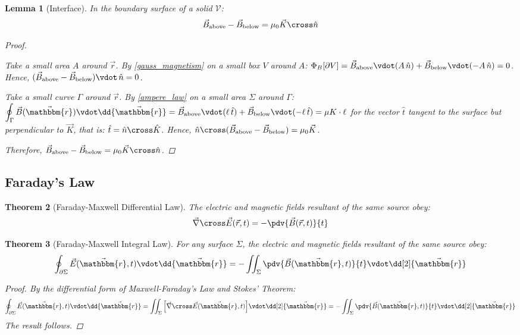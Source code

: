 \documentclass[12pt]{article}
\renewcommand{\curl}{\vec{\nabla}\cross}
\newcommand*{\rv}{\vec{r}}
\newcommand*{\irv}{\vec{\mathbbm{r}}}
\newcommand*{\vE}{\vec{E}}
\newcommand*{\vB}{\vec{B}}
\newcommand*{\mmu}{\mu_0}
\newcommand*{\vol}{\mathcal{V}}
\newtheorem{theorem}{Theorem}[subsection]
\newtheorem{lemma}[theorem]{Lemma}
\begin{document}
\begin{lemma}[Interface]
  \label{surface_B_field}
  In the boundary surface of a solid $\vol$: $$\vB_\text{above}-\vB_\text{below}=\mmu\vec{K}\cross\hat{n}$$
  \begin{proof}
    \begin{compactenum}
      \item Take a small area $A$ around $\rv$. By \ref{gauss_magnetism} on a small box $V$ around $A$: $\Phi_B[\partial V]=\vB_\text{above}\vdot(A\,\hat{n})+\vB_\text{below}\vdot(-A\,\hat{n})=0$. Hence, $(\vB_\text{above}-\vB_\text{below})\vdot\,\hat{n}=0$.
      \item Take a small curve $\Gamma$ around $\rv$. By \ref{ampere_law} on a small area $\Sigma$ around $\Gamma$: $\displaystyle\oint_\Gamma\vB(\irv)\vdot\dd{\irv}=\vB_\text{above}\vdot(\ell\,\hat{t})+\vB_\text{below}\vdot(-\ell\,\hat{t})=\mu K\cdot\ell$ for the vector $\hat{t}$ tangent to the surface but perpendicular to $\vec{K}$, that is: $\hat{t}=\hat{n}\cross\hat{K}$. Hence, $\hat{n}\cross(\vB_\text{above}-\vB_\text{below})=\mmu\vec{K}$.
    \end{compactenum}
    Therefore, $\vB_\text{above}-\vB_\text{below}=\mmu\vec{K}\cross\hat{n}$.
  \end{proof}
\end{lemma}

\pagebreak

\subsection{Faraday's Law}

\begin{theorem}[Faraday-Maxwell Differential Law]
  The electric and magnetic fields resultant of the same source obey: $$\curl\vE(\rv,t)=-\pdv{\vB(\rv,t)}{t}$$
\end{theorem}

\begin{theorem}[Faraday-Maxwell Integral Law]
  For any surface $\Sigma$, the electric and magnetic fields resultant of the same source obey: $$\displaystyle\oint_{\partial\Sigma}\vE(\irv,t)\vdot \dd{\irv}=-\iint_{\Sigma}\pdv{\vB(\irv,t)}{t}\vdot\dd[2]{\irv}$$
  \begin{proof}
    By the differential form of Maxwell-Faraday's Law and Stokes' Theorem: $$\oint_{\partial\Sigma}\vE(\irv,t)\vdot \dd{\irv}=\iint_\Sigma\Big[\curl\vE(\irv,t)\Big]\vdot\dd[2]{\irv}=-\iint_\Sigma\pdv{\vB(\irv,t)}{t}\vdot\dd[2]{\irv}$$ The result follows.
  \end{proof}
\end{theorem}
\end{document}
